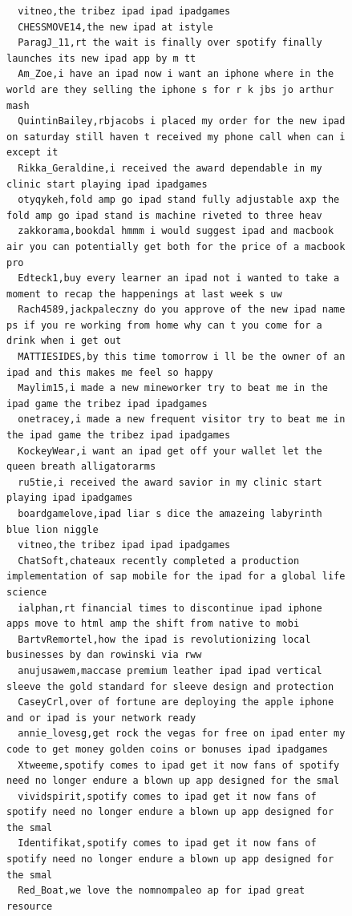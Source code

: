 \begin{figure}[htpb]
\begin{verbatim}
  vitneo,the tribez ipad ipad ipadgames
  CHESSMOVE14,the new ipad at istyle
  ParagJ_11,rt the wait is finally over spotify finally launches its new ipad app by m tt
  Am_Zoe,i have an ipad now i want an iphone where in the world are they selling the iphone s for r k jbs jo arthur mash
  QuintinBailey,rbjacobs i placed my order for the new ipad on saturday still haven t received my phone call when can i except it
  Rikka_Geraldine,i received the award dependable in my clinic start playing ipad ipadgames
  otyqykeh,fold amp go ipad stand fully adjustable axp the fold amp go ipad stand is machine riveted to three heav
  zakkorama,bookdal hmmm i would suggest ipad and macbook air you can potentially get both for the price of a macbook pro
  Edteck1,buy every learner an ipad not i wanted to take a moment to recap the happenings at last week s uw
  Rach4589,jackpaleczny do you approve of the new ipad name ps if you re working from home why can t you come for a drink when i get out
  MATTIESIDES,by this time tomorrow i ll be the owner of an ipad and this makes me feel so happy
  Maylim15,i made a new mineworker try to beat me in the ipad game the tribez ipad ipadgames
  onetracey,i made a new frequent visitor try to beat me in the ipad game the tribez ipad ipadgames
  KockeyWear,i want an ipad get off your wallet let the queen breath alligatorarms
  ru5tie,i received the award savior in my clinic start playing ipad ipadgames
  boardgamelove,ipad liar s dice the amazeing labyrinth blue lion niggle
  vitneo,the tribez ipad ipad ipadgames
  ChatSoft,chateaux recently completed a production implementation of sap mobile for the ipad for a global life science
  ialphan,rt financial times to discontinue ipad iphone apps move to html amp the shift from native to mobi
  BartvRemortel,how the ipad is revolutionizing local businesses by dan rowinski via rww
  anujusawem,maccase premium leather ipad ipad vertical sleeve the gold standard for sleeve design and protection
  CaseyCrl,over of fortune are deploying the apple iphone and or ipad is your network ready
  annie_lovesg,get rock the vegas for free on ipad enter my code to get money golden coins or bonuses ipad ipadgames
  Xtweeme,spotify comes to ipad get it now fans of spotify need no longer endure a blown up app designed for the smal
  vividspirit,spotify comes to ipad get it now fans of spotify need no longer endure a blown up app designed for the smal
  Identifikat,spotify comes to ipad get it now fans of spotify need no longer endure a blown up app designed for the smal
  Red_Boat,we love the nomnompaleo ap for ipad great resource

\end{verbatim}
\end{figure}
